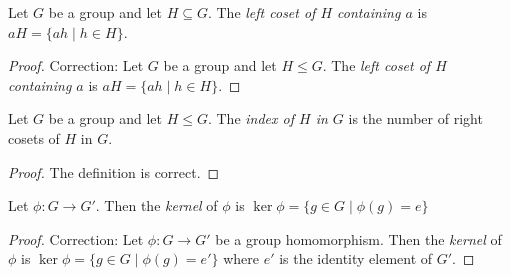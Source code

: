 \newpage
\begin{exercise}
    Let $G$ be a group and let $H\subseteq G$. The \textit{left coset of $H$ containing $a$} is $aH = \{ ah \mid h\in H \}$.
\end{exercise}

\begin{proof}
    Correction: Let $G$ be a group and let $H\leq G$. The \textit{left coset of $H$ containing $a$} is $aH = \{ ah \mid h\in H \}$.
\end{proof}

\newpage
\begin{exercise}
    Let $G$ be a group and let $H\leq G$. The \textit{index of $H$ in $G$} is the number of right cosets of $H$ in $G$.
\end{exercise}

\begin{proof}
    The definition is correct.
\end{proof}

\newpage
\begin{exercise}
    Let $\phi: G\to G'$. Then the \textit{kernel} of $\phi$ is $\ker\phi = \{ g \in G \mid \phi(g) = e \}$
\end{exercise}

\begin{proof}
    Correction: Let $\phi: G\to G'$ be a group homomorphism. Then the \textit{kernel} of $\phi$ is $\ker\phi = \{ g \in G \mid \phi(g) = e' \}$ where $e'$ is the identity element of $G'$.
\end{proof}

